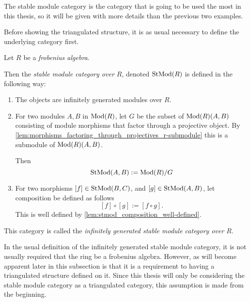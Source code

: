 
The stable module category is the category that is going to be used the most in this thesis, so it will be given with more details than the previous two examples.

Before showing the triangulated structure, it is as usual necessary to define the underlying category first.

\begin{definition}
    \label{def:stable_module_category}
    Let \( R \) be a \emph{frobenius algebra}.

    Then the \emph{stable module category over \( R \)}, denoted \( \operatorname{StMod}(R) \) is defined in the following way:
    \begin{enumerate}
        \item {
            The objects are infinitely generated modules over \( R \).
        }
        \item {
            For two modules \( A, B \) in \( \operatorname{Mod}(R) \), let \( G \) be the subset of \( \operatorname{Mod}(R)(A, B) \) consisting of module morphisms that factor through a projective object. By \autoref{lem:morphisms_factoring_through_projectives_r-submodule} this is a submodule of \( \operatorname{Mod}(R)(A, B) \).
            
            Then
            \[
                \operatorname{StMod}(A, B) := \operatorname{Mod}(R)/G
            \]
        }
        \item {
            For two morphisms \( [f] \in \operatorname{StMod}(B, C) \), and \( [g] \in \operatorname{StMod}(A, B) \), let composition be defined as follows
            \[
                [f] \circ [g] := [f \circ g].
            \]
            This is well defined by \autoref{lem:stmod_composition_well-defined}.
        }
    \end{enumerate}

    This category is called the \emph{infinitely generated stable module category over \( R \)}.
\end{definition}

In the usual definition of the infinitely generated stable module category, it is not usually required that the ring be a frobenius algebra. However, as will become apparent later in this subsection is that it is a requirement to having a triangulated structure defined on it. Since this thesis will only be considering the stable module category as a triangulated category, this assumption is made from the beginning.

